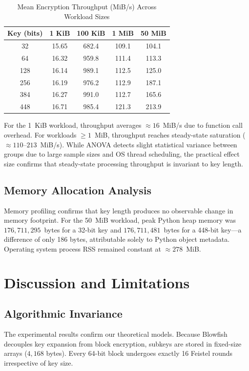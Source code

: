 \documentclass[conference]{IEEEtran}
\begin{document}
\begin{table}[htbp]
\caption{Mean Encryption Throughput (MiB/s) Across Workload Sizes}
\label{tab:throughput_summary}
\centering
\begin{tabular}{ccccc}
\toprule
\textbf{Key (bits)} & \textbf{1 KiB} & \textbf{100 KiB} & \textbf{1 MiB} & \textbf{50 MiB} \\
\midrule
32  & 15.65 & 682.4 & 109.1 & 104.1 \\
64  & 16.32 & 959.8 & 111.4 & 113.3 \\
128 & 16.14 & 989.1 & 112.5 & 125.0 \\
256 & 16.19 & 976.2 & 112.9 & 187.1 \\
384 & 16.27 & 991.0 & 112.7 & 165.6 \\
448 & 16.71 & 985.4 & 121.3 & 213.9 \\
\bottomrule
\end{tabular}
\end{table}

For the 1~KiB workload, throughput averages $\approx 16$~MiB/s due to function call overhead. For workloads $\ge 1$~MiB, throughput reaches steady-state saturation ($\approx 110$--$213$~MiB/s). While ANOVA detects slight statistical variance between groups due to large sample sizes and OS thread scheduling, the practical effect size confirms that steady-state processing throughput is invariant to key length.

\subsection{Memory Allocation Analysis}
Memory profiling confirms that key length produces no observable change in memory footprint. For the 50~MiB workload, peak Python heap memory was $176,711,295$~bytes for a 32-bit key and $176,711,481$~bytes for a 448-bit key—a difference of only 186 bytes, attributable solely to Python object metadata. Operating system process RSS remained constant at $\approx 278$~MiB.

\section{Discussion and Limitations}

\subsection{Algorithmic Invariance}
The experimental results confirm our theoretical models. Because Blowfish decouples key expansion from block encryption, subkeys are stored in fixed-size arrays ($4,168$ bytes). Every 64-bit block undergoes exactly 16 Feistel rounds irrespective of key size.
\end{document}
